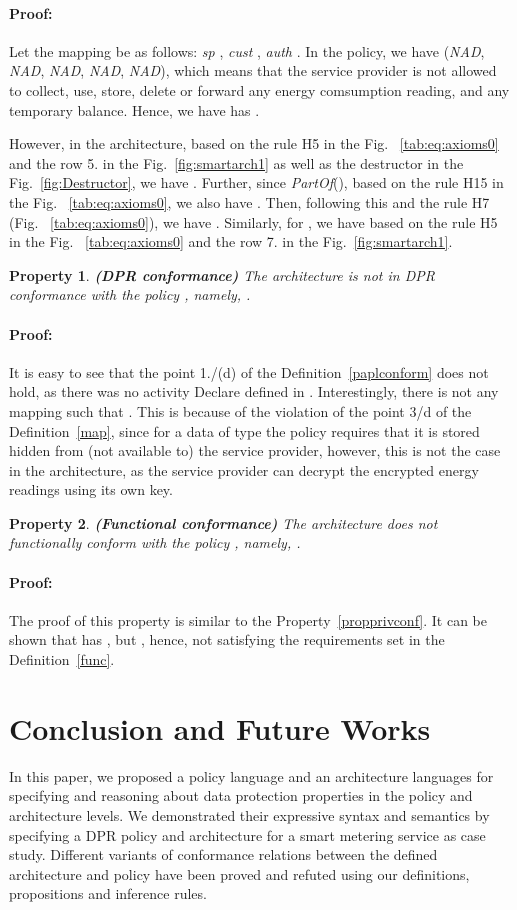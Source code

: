 \documentclass[a4paper]{article}
\newtheorem{ttp}{Property}
\newenvironment{proof}{\paragraph{Proof:}}{\hfill}
\begin{document}
\begin{proof}
Let the mapping  be as follows: \textit{sp}  , \textit{cust}  , \textit{auth}  .  In the policy, we have     (\textit{NAD}, \textit{NAD}, \textit{NAD}, \textit{NAD}, \textit{NAD}), which means that the service provider is not allowed to collect, use, store, delete or forward any energy comsumption  reading, and any temporary balance. Hence, we have  has .     

However, in the architecture, based on the rule H5 in the Fig.
~\ref{tab:eq:axioms0} and the row 5. in the Fig.~\ref{fig:smartarch1} as well as the destructor in the Fig.~\ref{fig:Destructor}, we have . Further, since   \textit{PartOf}(), based on the rule H15 in the Fig.
~\ref{tab:eq:axioms0}, we also have . Then, following this and the rule H7 (Fig.
~\ref{tab:eq:axioms0}), we have . Similarly, for  , we have  based on the rule H5 in the Fig.
~\ref{tab:eq:axioms0} and the row 7. in the Fig.~\ref{fig:smartarch1}. 
\end{proof} 

\begin{ttp} \textbf{(DPR conformance)}
The architecture  is \textit{not in DPR conformance} with the policy , namely,   .   
\end{ttp}
\begin{proof} 
It is easy to see that the point 1./(d) of the Definition~\ref{paplconform} does not hold, as there was no activity Declare  defined in . 
Interestingly, there is not any mapping  such that   . This is because of the violation of the point 3/d of the Definition~\ref{map}, since for a data of type  the policy requires that it is stored hidden from (not available to) the service provider, however, this is not the case in the architecture, as the service provider can decrypt the encrypted energy readings using its own key. 

\end{proof} 


\begin{ttp} \textbf{(Functional conformance)}
The architecture  does \textit{not functionally conform} with the policy , namely,   .   
\end{ttp}
\begin{proof} 
The proof of this property is similar to the Property~\ref{propprivconf}. It can be shown that  has , but   , hence, not satisfying the requirements set in the Definition~\ref{func}.    
\end{proof} 

\section{Conclusion and Future Works}
In this paper, we proposed a policy language and an architecture languages for specifying and reasoning about data protection properties in the policy and architecture levels. We demonstrated their expressive syntax and semantics by specifying a DPR policy and architecture for a smart metering service as case study. Different variants of conformance relations between the defined architecture and policy have been proved and refuted using our definitions,  propositions and inference rules. 
\end{document}

